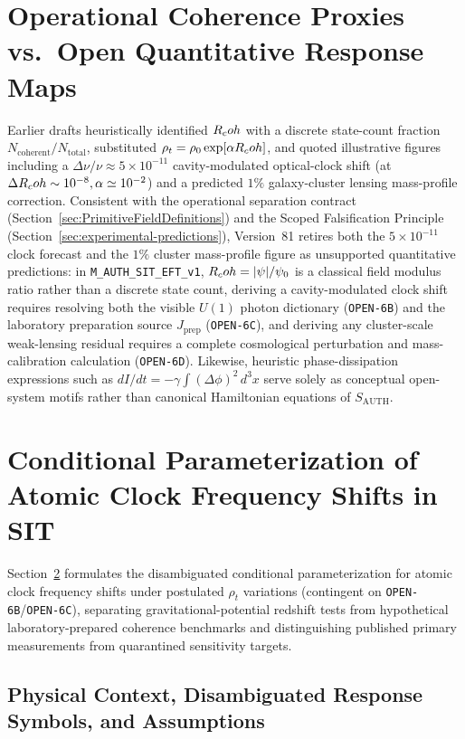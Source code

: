 \section{Operational Coherence Proxies vs.\ Open Quantitative Response Maps}
\label{sec:quantitative}

Earlier drafts heuristically identified $R_coh$ with a discrete state-count fraction $N_{\mathrm{coherent}}/N_{\mathrm{total}}$, substituted $\rho_t = \rho_0\exp[\alpha R_coh]$, and quoted illustrative figures including a $\Delta\nu/\nu \approx 5\times 10^{-11}$ cavity-modulated optical-clock shift (at $\Delta R_coh \sim 10^{-8}, \alpha \simeq 10^{-2}$) and a predicted $1\%$ galaxy-cluster lensing mass-profile correction. Consistent with the operational separation contract (Section~\ref{sec:PrimitiveFieldDefinitions}) and the Scoped Falsification Principle (Section~\ref{sec:experimental-predictions}), Version~81 retires both the $5\times 10^{-11}$ clock forecast and the $1\%$ cluster mass-profile figure as unsupported quantitative predictions: in \texttt{M\_AUTH\_SIT\_EFT\_v1}, $R_coh = |\psi|/\psi_0$ is a classical field modulus ratio rather than a discrete state count, deriving a cavity-modulated clock shift requires resolving both the visible $U(1)$ photon dictionary (\texttt{OPEN-6B}) and the laboratory preparation source $J_{\mathrm{prep}}$ (\texttt{OPEN-6C}), and deriving any cluster-scale weak-lensing residual requires a complete cosmological perturbation and mass-calibration calculation (\texttt{OPEN-6D}). Likewise, heuristic phase-dissipation expressions such as $dI/dt = -\gamma\int (\Delta\phi)^2\,d^3x$ serve solely as conceptual open-system motifs rather than canonical Hamiltonian equations of $S_{\mathrm{AUTH}}$.

\section{Conditional Parameterization of Atomic Clock Frequency Shifts in SIT}
\label{sec:atomic-clock-prediction}
\label{sec:atomic-clocks}

Section~\ref{sec:atomic-clock-prediction} formulates the disambiguated conditional parameterization for atomic clock frequency shifts under postulated $\rho_t$ variations (contingent on \texttt{OPEN-6B}/\texttt{OPEN-6C}), separating gravitational-potential redshift tests from hypothetical laboratory-prepared coherence benchmarks and distinguishing published primary measurements from quarantined sensitivity targets.

\subsection{Physical Context, Disambiguated Response Symbols, and Assumptions} %

